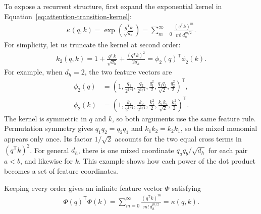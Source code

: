 \documentclass[11pt]{article}
\begin{document}
To expose a recurrent structure, first expand the exponential kernel in
Equation~\eqref{eq:attention-transition-kernel}:
\begin{equation}
  \begin{split}
  \kappa(q,k)
  =\exp\!\left(\frac{q^{\mathsf T}k}{\sqrt{d_h}}\right)
  =\sum_{m=0}^{\infty}
    \frac{(q^{\mathsf T}k)^m}{m!\,d_h^{m/2}}.
  \label{eq:softmax-taylor}
  \end{split}
\end{equation}
For simplicity, let us truncate the kernel at second order:
\begin{equation}
  \begin{split}
  k_2(q,k)
  =1+\frac{q^{\mathsf T}k}{\sqrt{d_h}}
   +\frac{(q^{\mathsf T}k)^2}{2d_h}
  =\phi_2(q)^{\mathsf T}\phi_2(k).
  \label{eq:quadratic-kernel}
  \end{split}
\end{equation}
For example, when $d_h=2$, the two feature vectors are
\begin{equation}
  \begin{split}
    \phi_2(q)
    &=\left(
      1,
      \frac{q_1}{2^{1/4}},
      \frac{q_2}{2^{1/4}},
      \frac{q_1^2}{2},
      \frac{q_1q_2}{\sqrt{2}},
      \frac{q_2^2}{2}
    \right)^{\mathsf T},\\
    \phi_2(k)
    &=\left(
      1,
      \frac{k_1}{2^{1/4}},
      \frac{k_2}{2^{1/4}},
      \frac{k_1^2}{2},
      \frac{k_1k_2}{\sqrt{2}},
      \frac{k_2^2}{2}
    \right)^{\mathsf T}.
  \label{eq:quadratic-feature-vectors}
  \end{split}
\end{equation}
The kernel is symmetric in $q$ and $k$, so both arguments use the same feature
rule.  Permutation symmetry gives $q_1q_2=q_2q_1$ and $k_1k_2=k_2k_1$, so the
mixed monomial appears only once.  Its factor $1/\sqrt{2}$ accounts for the two
equal cross terms in $(q^{\mathsf T}k)^2$.  For general $d_h$, there is one
mixed coordinate $q_aq_b/\sqrt{d_h}$ for each pair $a<b$, and likewise for
$k$.  This example shows how each power of the dot product becomes a set of
feature coordinates.

Keeping every order gives an infinite feature vector $\Phi$ satisfying
\begin{equation}
  \begin{split}
  \Phi(q)^{\mathsf T}\Phi(k)
  =\sum_{m=0}^{\infty}
    \frac{(q^{\mathsf T}k)^m}{m!\,d_h^{m/2}}
  =\kappa(q,k).
  \label{eq:infinite-feature-map}
  \end{split}
\end{equation}
\end{document}
